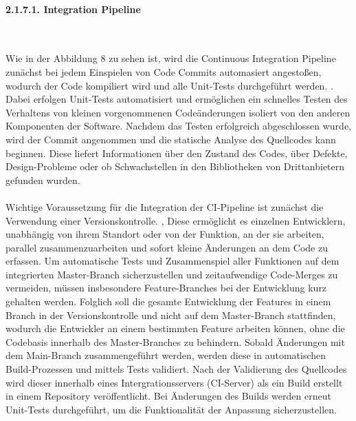 \paragraph{2.1.7.1. Integration Pipeline} $~$

Wie in der Abbildung 8 zu sehen ist, wird die Continuous Integration Pipeline zunächst bei jedem Einspielen von Code Commits automasiert angestoßen, wodurch der Code kompiliert wird und alle Unit-Tests durchgeführt werden. \cite[S. 266]{tokarski_strategische_2018}. Dabei erfolgen Unit-Tests automatisiert und ermöglichen ein schnelles Testen des Verhaltens von kleinen vorgenommenen Codeänderungen isoliert von den anderen Komponenten der Software. \cite[S. 60]{humble_continuous_2011} Nachdem das Testen erfolgreich abgeschlossen wurde, wird der Commit angenommen und die statische Analyse des Quellcodes kann beginnen. \cite[S. 61]{verona_practical_2016} Diese liefert Informationen über den Zustand des Codes, über Defekte, Design-Probleme oder ob Schwachstellen in den Bibliotheken von Drittanbietern gefunden wurden. \cite[S. 61]{verona_practical_2016}\\\\ Wichtige Voraussetzung für die Integration der CI-Pipeline ist zunächst die Verwendung einer Versionskontrolle. \cite[S. 100 - 101]{bass_devops_2015}, \cite[S. 57]{forsgren_mindset_2019} Diese ermöglicht es einzelnen Entwicklern, unabhängig von ihrem Standort oder von der Funktion, an der sie arbeiten, parallel zusammenzuarbeiten und sofort kleine Änderungen an dem Code zu erfassen. \cite[S. 57]{humble_continuous_2011} Um automatische Tests und Zusammenspiel aller Funktionen auf dem integrierten Master-Branch sicherzustellen und zeitaufwendige Code-Merges zu vermeiden, müssen insbesondere Feature-Branches bei der Entwicklung kurz gehalten werden. \cite{meyer_continuous_2014} Folglich soll die gesamte Entwicklung der Features in einem Branch in der Versionskontrolle und nicht auf dem Master-Branch stattfinden, wodurch die Entwickler an einem bestimmten Feature arbeiten können, ohne die Codebasis innerhalb des Master-Branches zu behindern. \cite[S. 44 - 45]{verona_practical_2016} Sobald Änderungen mit dem Main-Branch zusammengeführt werden, werden diese in automatischen Build-Prozessen und mittels Tests validiert. Nach der Validierung des Quellcodes wird dieser innerhalb eines Intergrationsservers (CI-Server) als ein Build erstellt in einem Repository veröffentlicht. Bei Änderungen des Builds werden erneut Unit-Tests durchgeführt, um die Funktionalität der Anpassung sicherzustellen. \cite[S. 57]{forsgren_mindset_2019} 


